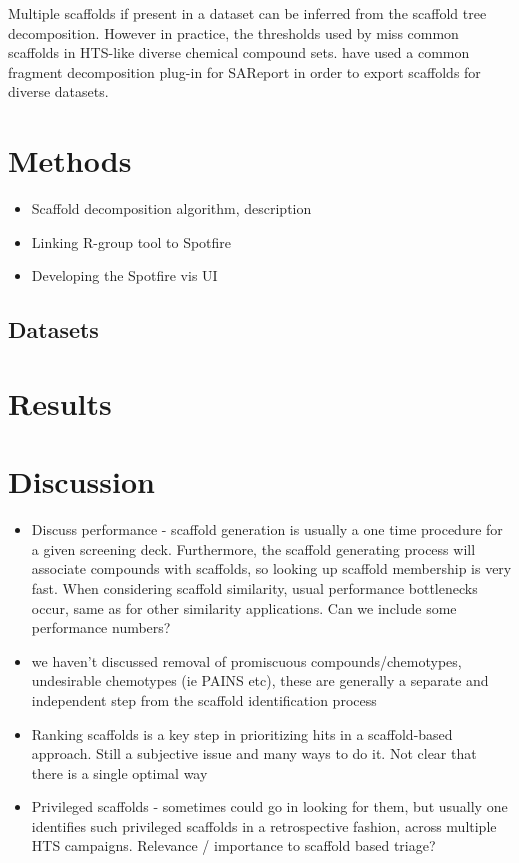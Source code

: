 \documentclass[journal=jacsat,manuscript=article]{achemso}
\begin{document}
Multiple scaffolds if present in a dataset can be inferred from the scaffold
tree decomposition\cite{ClarkLabute2008SAReport}. However in practice, the
thresholds used by \citeauthor{ClarkLabute2008SAReport} miss common scaffolds in
HTS-like diverse chemical compound sets. \citeauthor{Bandyopadhyay2011ACS} have
used a common fragment decomposition plug-in for SAReport in order to export
scaffolds for diverse datasets.

\section{Methods}
\label{sec:methods}

\begin{itemize}
\item Scaffold decomposition algorithm, description
\item Linking R-group tool to Spotfire
\item Developing the Spotfire vis UI
\end{itemize}

\subsection{Datasets}
\label{sec:datasets}

\section{Results}

\section{Discussion}
\label{sec:discussion}

\begin{itemize}
\item Discuss performance - scaffold generation is usually a one time procedure
  for a given screening deck. Furthermore, the scaffold generating process will
  associate compounds with scaffolds, so looking up scaffold membership is very
  fast. When considering scaffold similarity, usual performance bottlenecks
  occur, same as for other similarity applications. Can we include some
  performance numbers?
\item we haven't discussed removal of promiscuous compounds/chemotypes,
  undesirable chemotypes (ie PAINS etc), these are generally a separate and
  independent step from the scaffold identification process
\item Ranking scaffolds is a key step in prioritizing hits in a scaffold-based
  approach. Still a subjective issue and many ways to do it. Not clear that
  there is a single optimal way
\item Privileged scaffolds - sometimes could go in looking for them, but usually
  one identifies such privileged scaffolds in a retrospective fashion, across
  multiple HTS campaigns. Relevance / importance to scaffold based triage?
\end{itemize}
\end{document}
